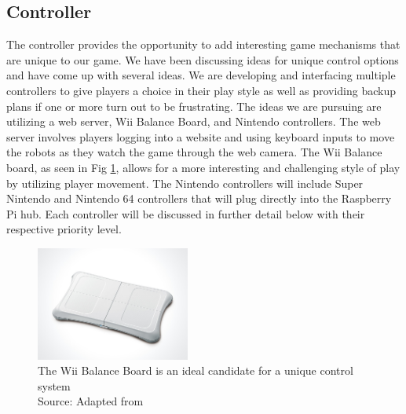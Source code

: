 \documentclass[11pt]{ieeeconf}
\begin{document}
\subsection{Controller}
The controller provides the opportunity to add interesting game mechanisms that are unique to our game. We have been discussing ideas for unique control options and have come up with several ideas. We are developing and interfacing multiple controllers to give players a choice in their play style as well as providing backup plans if one or more turn out to be frustrating. The ideas we are pursuing are utilizing a web server, Wii Balance Board, and Nintendo controllers. The web server involves players logging into a website and using keyboard inputs to move the robots as they watch the game through the web camera. The Wii Balance board, as seen in Fig \ref{Wii}, allows for a more interesting and challenging style of play by utilizing player movement. The Nintendo controllers will include Super Nintendo and Nintendo 64 controllers that will plug directly into the Raspberry Pi hub. Each controller will be discussed in further detail below with their respective priority level.

\begin{figure}[h]
\centering
\captionsetup{justification=centering}
\includegraphics[width=0.45\textwidth]{images/wii.png}
\caption{The Wii Balance Board is an ideal candidate for a unique control system\\ Source: Adapted from \cite{wiiboard:19}}
\label{Wii}
\end{figure}
\end{document}
